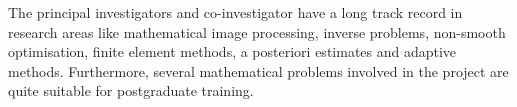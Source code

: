 \documentclass[enabledeprecatedfontcommands,cleardoublepage=empty,headsepline,twoside,11pt,DIV=15,BCOR=12mm,final]{scrartcl}
\begin{document}


The principal investigators and co-investigator have a long track record in research areas like mathematical image processing, inverse problems, non-smooth optimisation, finite element methods, a posteriori estimates and adaptive methods. Furthermore, several mathematical problems involved in the project are quite suitable for postgraduate training.




\end{document}
